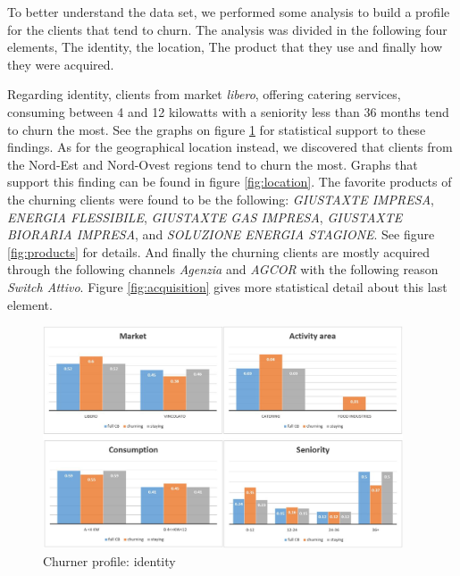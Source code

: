 \documentclass[LaM,binding=0.6cm, english]{sapthesis}
\begin{document}
To better understand the data set, we performed some analysis to build a profile for the clients that tend to churn. The analysis was divided in the following four elements, The identity, the location, The product that they use and finally how they were acquired.

Regarding identity, clients from market \textit{libero}, offering catering services, consuming between 4 and 12 kilowatts with a seniority less than 36 months tend to churn the most. See the graphs on figure \ref{fig:identity} for statistical support to these findings. As for the geographical location instead, we discovered that clients from the Nord-Est and Nord-Ovest regions tend to churn the most. Graphs that support this finding can be found in figure \ref{fig:location}. The favorite products of the churning clients were found to be the following: \textit{GIUSTAXTE IMPRESA}, \textit{ENERGIA FLESSIBILE}, \textit{GIUSTAXTE GAS IMPRESA}, \textit{GIUSTAXTE BIORARIA IMPRESA}, and \textit{SOLUZIONE ENERGIA STAGIONE}. See figure \ref{fig:products} for details. And finally the churning clients are mostly acquired through the following channels \textit{Agenzia} and \textit{AGCOR} with the following reason \textit{Switch Attivo}. Figure \ref{fig:acquisition} gives more statistical detail about this last element.

\begin{figure}[!ht]
    \includegraphics[width=0.95\textwidth]{images/identity.jpg}
    \centering
    \caption{Churner profile: identity}
    \label{fig:identity}
\end{figure}
\end{document}
